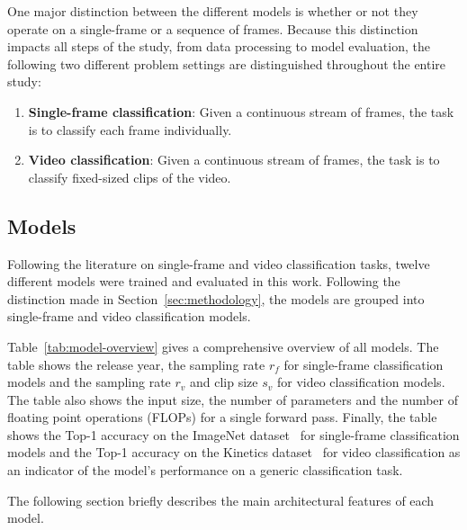 \documentclass[a4paper]{article}
\begin{document}
One major distinction between the different models is whether or not they
operate on a single-frame or a sequence of frames. Because this distinction
impacts all steps of the study, from data processing to model evaluation, the
following two different problem settings are distinguished throughout the entire
study:

\begin{enumerate}

\item \textbf{Single-frame classification}: Given a continuous stream of frames,
  the task is to classify each frame individually.

\item \textbf{Video classification}: Given a continuous stream of frames, the
  task is to classify fixed-sized clips of the video.

\end{enumerate}


\subsection{Models} %
\label{sub:models}


Following the literature on single-frame and video classification tasks, twelve
different models were trained and evaluated in this work. Following the
distinction made in Section~\ref{sec:methodology}, the models are grouped into
single-frame and video classification models. 

Table~\ref{tab:model-overview} gives a comprehensive overview of all models. The
table shows the release year, the sampling rate $r_f$ for single-frame
classification models and the sampling rate $r_v$ and clip size $s_v$ for video
classification models. The table also shows the input size, the number of
parameters and the number of floating point operations (FLOPs) for a single
forward pass. Finally, the table shows the Top-1 accuracy on the ImageNet
dataset~\cite{imagenet} for single-frame classification models and the Top-1
accuracy on the Kinetics dataset~\cite{kinetics} for video classification as an
indicator of the model's performance on a generic classification task.

The following section briefly describes the main architectural features of each
model.

\end{document}
